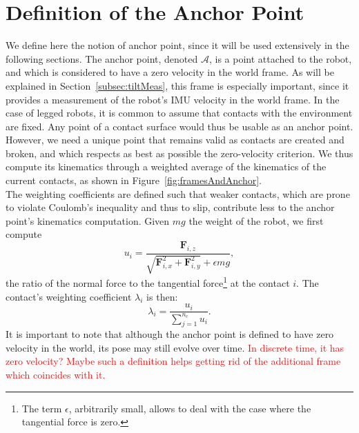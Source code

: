 \documentclass{IJCAS}
\begin{document}
\section{Definition of the Anchor Point}\label{sec:anchor_point}
We define here the notion of anchor point, since it will be used extensively in the following sections. The anchor point, denoted $\mathcal{A}$, is a point attached to the robot, and which is considered to have a zero velocity in the world frame. As will be explained in Section~\ref{subsec:tiltMeas}, this frame is especially important, since it provides a measurement of the robot's IMU velocity in the world frame. In the case of legged robots, it is common to assume that contacts with the environment are fixed. Any point of a contact surface would thus be usable as an anchor point. However, we need a unique point that remains valid as contacts are created and broken, and which respects as best as possible the zero-velocity criterion.
We thus compute its kinematics through a weighted average of the kinematics of the current contacts, as shown in Figure~\ref{fig:framesAndAnchor}.  \\
The weighting coefficients are defined such that weaker contacts, which are prone to violate Coulomb's inequality and thus to slip, contribute less to the anchor point's kinematics computation. Given $mg$ the weight of the robot, we first compute 
\begin{equation}
    u_{i} = \frac{\boldsymbol{F}_{i,z}}{\sqrt{\boldsymbol{F}_{i,x}^2 + \boldsymbol{F}_{i,y}^2} + \epsilon mg}, \label{eq:ratio_ui}
\end{equation}
the ratio of the normal force to the tangential force\footnote{The term $\epsilon$, arbitrarily small, allows to deal with the case where the tangential force is zero.} at the contact $i$. The contact's weighting coefficient $\lambda_{i}$ is then:
\begin{equation}
    \lambda_{i}=\frac{u_{i}}{\sum^{n_{c}}_{j=1}u_{i}}.
\end{equation}
It is important to note that although the anchor point is defined to have zero velocity in the world, its pose may still evolve over time. \textcolor{red}{In discrete time, it has zero velocity? Maybe such a definition helps getting rid of the additional frame which coincides with it.}
\end{document}
